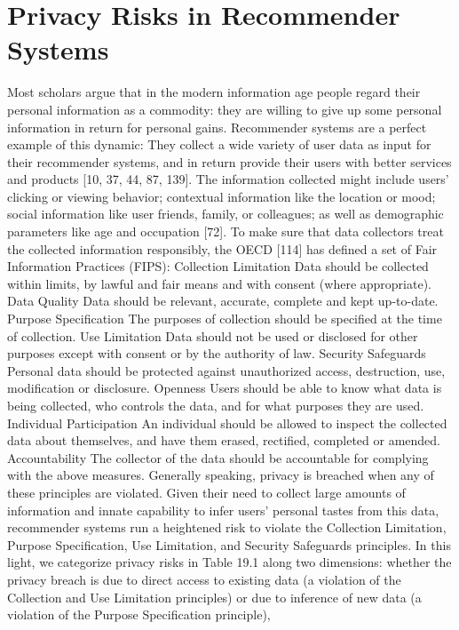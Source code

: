 \section{Privacy Risks in Recommender Systems}
Most scholars argue that in the modern information age people regard their personal
information as a commodity: they are willing to give up some personal information
in return for personal gains. Recommender systems are a perfect example of this
dynamic: They collect a wide variety of user data as input for their recommender
systems, and in return provide their users with better services and products [10, 37,
44, 87, 139]. The information collected might include users’ clicking or viewing
behavior; contextual information like the location or mood; social information like
user friends, family, or colleagues; as well as demographic parameters like age and
occupation [72]. To make sure that data collectors treat the collected information
responsibly, the OECD [114] has defined a set of Fair Information Practices (FIPS):
Collection Limitation Data should be collected within limits, by lawful and fair
means and with consent (where appropriate).
Data Quality Data should be relevant, accurate, complete and kept up-to-date.
Purpose Specification The purposes of collection should be specified at the time
of collection.
Use Limitation Data should not be used or disclosed for other purposes except
with consent or by the authority of law.
Security Safeguards Personal data should be protected against unauthorized
access, destruction, use, modification or disclosure.
Openness Users should be able to know what data is being collected, who
controls the data, and for what purposes they are used.
Individual Participation An individual should be allowed to inspect the
collected data about themselves, and have them erased, rectified, completed
or amended.
Accountability The collector of the data should be accountable for complying
with the above measures.
Generally speaking, privacy is breached when any of these principles are
violated. Given their need to collect large amounts of information and innate
capability to infer users’ personal tastes from this data, recommender systems run
a heightened risk to violate the Collection Limitation, Purpose Specification, Use
Limitation, and Security Safeguards principles. In this light, we categorize privacy
risks in Table 19.1 along two dimensions: whether the privacy breach is due to direct
access to existing data (a violation of the Collection and Use Limitation principles)
or due to inference of new data (a violation of the Purpose Specification principle),
